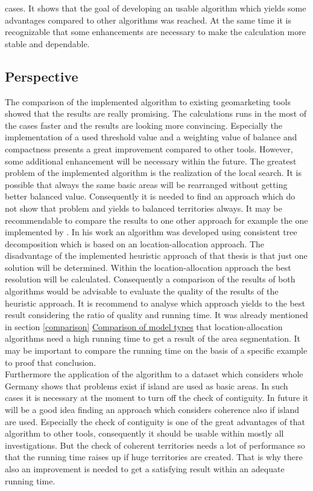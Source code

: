 cases. It shows that the goal of developing an usable algorithm which yields some advantages compared to other algorithms was reached. At the same time it is recognizable that some enhancements are necessary to make the calculation more stable and dependable.

\subsection{Perspective}
The comparison of the implemented algorithm to existing geomarketing tools showed that the results are really promising. The calculations runs in the most of the cases faster and the results are looking more convincing. Especially the implementation of a used threshold value and a weighting value of balance and compactness presents a great improvement compared to other tools. However, some additional enhancement will be necessary within the future. The greatest problem of the implemented algorithm is the realization of the local search. It is possible that always the same basic areas will be rearranged without getting better balanced value. Consequently it is needed to find an approach which do not show that problem and yields to balanced territories always. It may be recommendable to compare the results to one other approach for example the one implemented by \citeauthor{kalcsics} \cite{kalcsics}. In his work an algorithm was developed using consistent tree decomposition which is based on an location-allocation approach. The disadvantage of the implemented heuristic approach of that thesis is that just one solution will be determined. Within the location-allocation approach the best resolution will be calculated. Consequently a comparison of the results of both algorithms would be advisable to evaluate the quality of the results of the heuristic approach. It is recommend to analyse which approach yields to the best result considering the ratio of quality and running time. It was already mentioned in section \ref{comparison} \hyperref[comparison]{Comparison of model types} that location-allocation algorithms need a high running time to get a result of the area segmentation. It may be important to compare the running time on the basis of a specific example to proof that conclusion. \\
Furthermore the application of the algorithm to a dataset which considers whole Germany shows that problems exist if island are used as basic areas. In such cases it is necessary at the moment to turn off the check of contiguity. In future it will be a good idea finding an approach which considers coherence also if island are used. Especially the check of contiguity is one of the great advantages of that algorithm to other tools, consequently it should be usable within mostly all investigations. But the check of coherent territories needs a lot of performance so that the running time raises up if huge territories are created. That is why there also an improvement is needed to get a satisfying result within an adequate running time.\\
